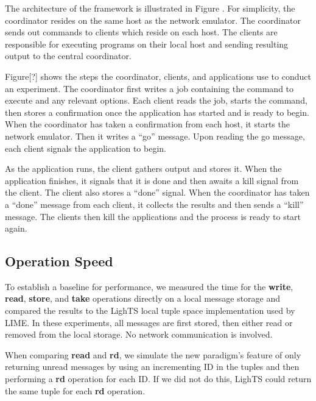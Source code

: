 \documentclass[lnicst]{svmultln}
\begin{document}
The architecture of the framework is illustrated in Figure \cite{fig:coordarchitecture}. For simplicity, the coordinator resides on the same host as the network emulator. The coordinator sends out commands to clients which reside on each host. The clients are responsible for executing programs on their local host and sending resulting output to the central coordinator.

Figure[?] shows the steps the coordinator, clients, and applications use to conduct an experiment. The coordinator first writes a job containing the command to execute and any relevant options. Each client reads the job, starts the command, then stores a confirmation once the application has started and is ready to begin. When the coordinator has taken a confirmation from each host, it starts the network emulator. Then it writes a “go” message. Upon reading the go message, each client signals the application to begin.

As the application runs, the client gathers output and stores it. When the application finishes, it signals that it is done and then awaits a kill signal from the client. The client also stores a “done” signal. When the coordinator has taken a “done” message from each client, it collects the results and then sends a “kill” message. The clients then kill the applications and the process is ready to start again.


\subsection{Operation Speed}

To establish a baseline for performance, we measured the time for the \textbf{write}, \textbf{read}, \textbf{store}, and \textbf{take} operations directly on a local message storage and compared the results to the LighTS\cite{lights} local tuple space implementation used by LIME. In these experiments, all messages are first stored, then either read or removed from the local storage. No network communication is involved.

When comparing \textbf{read} and \textbf{rd}, we simulate the new paradigm's feature of only returning unread messages by using an incrementing ID in the tuples and then performing a \textbf{rd} operation for each ID. If we did not do this, LighTS could return the same tuple for each \textbf{rd} operation.
\end{document}
